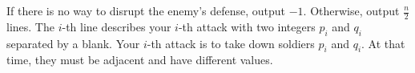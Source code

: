 If there is no way to disrupt the enemy's defense, output $-1$.
Otherwise, output $\frac{n}{2}$ lines.
The $i$-th line describes your $i$-th attack with two integers $p_i$ and $q_i$ 
separated by a blank.
Your $i$-th attack is to take down soldiers $p_i$ and $q_i$.
At that time, they must be adjacent and have different values.

